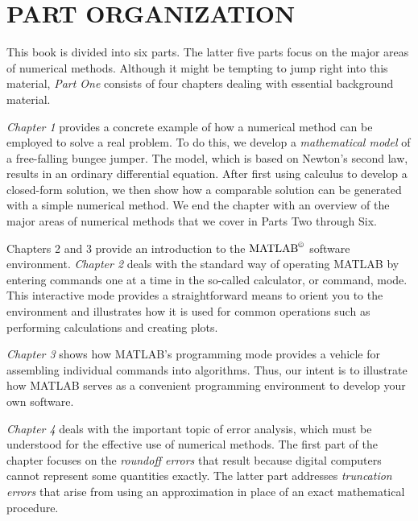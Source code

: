 \documentclass[../main.tex]{subfiles}
\begin{document}
\section{PART ORGANIZATION}
\label{sec:sec_P_2_2}
This book is divided into six parts. The latter five parts focus on the major areas of numerical methods. Although it might be tempting to jump right into this material, \textsl{Part One} consists of four chapters dealing with essential background material.


\textsl{Chapter 1} provides a concrete example of how a numerical method can be employed
to solve a real problem. To do this, we develop a \textsl{mathematical model} of a free-falling
bungee jumper. The model, which is based on Newton’s second law, results in an ordinary
differential equation. After first using calculus to develop a closed-form solution, we then
show how a comparable solution can be generated with a simple numerical method. We
end the chapter with an overview of the major areas of numerical methods that we cover in
Parts Two through Six.


Chapters 2 and 3 provide an introduction to the $\text{MATLAB}^\copyright$ software environment.
\textsl{Chapter 2} deals with the standard way of operating MATLAB by entering commands one
at a time in the so-called calculator, or command, mode. This interactive mode provides a
straightforward means to orient you to the environment and illustrates how it is used for
common operations such as performing calculations and creating plots.

\textsl{Chapter 3} shows how MATLAB’s programming mode provides a vehicle for assembling individual commands into algorithms. Thus, our intent is to illustrate how MATLAB
serves as a convenient programming environment to develop your own software.


\textsl{Chapter 4} deals with the important topic of error analysis, which must be understood
for the effective use of numerical methods. The first part of the chapter focuses on the
\textsl{roundoff errors} that result because digital computers cannot represent some quantities
exactly. The latter part addresses \textsl{truncation errors} that arise from using an approximation
in place of an exact mathematical procedure.
\newpage
\newpage
\end{document}
